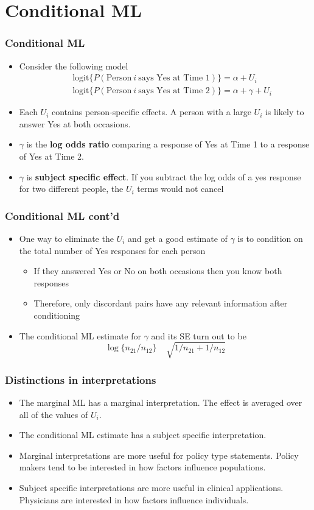 \documentclass[aspectratio=169]{beamer}
\begin{document}
\section{Conditional ML}
\begin{frame}\frametitle{Conditional ML}
\begin{itemize}
\item Consider the following model
\begin{eqnarray*}
&&\mathrm{logit}\{P(\mbox{Person} ~i~ \mbox{says Yes at Time 1})\} = \alpha + U_i\\
&&\mathrm{logit}\{P(\mbox{Person} ~i~ \mbox{says Yes at Time 2})\} = \alpha + \gamma + U_i
\end{eqnarray*}
\item Each $U_i$ contains person-specific effects. A person with a large $U_i$ is likely
  to answer Yes at both occasions.
\item $\gamma$ is the {\bf log odds ratio} comparing a response of Yes at Time 1 to 
  a response of Yes at Time 2.
\item $\gamma$ is {\bf subject specific effect}. If you subtract the log odds of a yes response
  for two different people, the $U_i$ terms would not cancel
\end{itemize}
\end{frame}

\begin{frame}\frametitle{Conditional ML cont'd}
\begin{itemize}
\item One way to eliminate the $U_i$ and get a good estimate of $\gamma$ is 
  to condition on the total number of Yes responses for each person
  \begin{itemize}
  \item If they answered Yes or No on both occasions then you know both responses
  \item Therefore, only discordant pairs have any relevant information
    after conditioning
  \end{itemize}
\item The conditional ML estimate for $\gamma$  and its SE turn out to be
$$
\log\{n_{21}/n_{12}\} ~~~~~ \sqrt{1/n_{21} + 1/n_{12}}
$$
\end{itemize}
\end{frame}

\begin{frame}\frametitle{Distinctions in interpretations}
\begin{itemize}
\item The marginal ML has a marginal interpretation. The effect is averaged over
  all of the values of $U_i$. 
\item The conditional ML estimate has a subject specific interpretation. 
\item Marginal interpretations are more useful for policy type statements. Policy
  makers tend to be interested in how factors influence populations.
\item Subject specific interpretations are more useful in clinical applications. 
  Physicians are interested in how factors influence individuals.
\end{itemize}
\end{frame}
\end{document}
